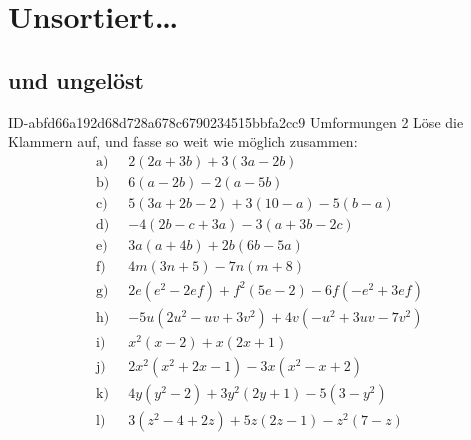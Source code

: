 \setcounter{chapter}{-1}
\chapter{Unsortiert\ldots}

\section{und ungelöst}

\begin{exercise}
      {ID-abfd66a192d68d728a678c6790234515bbfa2cc9}
      {Umformungen 2}
  \ifproblem\problem
    \newcommand{\gap}{\;\;}%
    Löse die Klammern auf, und fasse so weit wie möglich zusammen:
    \begin{equation*}
      \begin{split}
        \text{a)}\gap & 2(2a+3b)+3(3a-2b) \\
        \text{b)}\gap & 6(a-2b)-2(a-5b) \\
        \text{c)}\gap & 5(3a+2b-2)+3(10-a)-5(b-a) \\
        \text{d)}\gap & -4(2b-c+3a)-3(a+3b-2c) \\
        \text{e)}\gap & 3a(a+4b)+2b(6b-5a) \\
        \text{f)}\gap & 4m(3n+5)-7n(m+8) \\
        \text{g)}\gap & 2e(e^2-2ef)+f^2(5e-2)-6f(-e^2+3ef) \\
        \text{h)}\gap & -5u(2u^2-uv+3v^2)+4v(-u^2+3uv-7v^2) \\
        \text{i)}\gap & x^2(x-2)+x(2x+1) \\
        \text{j)}\gap & 2x^2(x^2+2x-1)-3x(x^2-x+2) \\
        \text{k)}\gap & 4y(y^2-2)+3y^2(2y+1)-5(3-y^2) \\
        \text{l)}\gap & 3(z^2-4+2z)+5z(2z-1)-z^2(7-z)
      \end{split}
    \end{equation*}
  \fi
\end{exercise}


